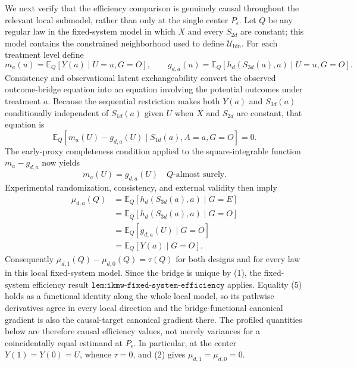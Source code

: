 We next verify that the efficiency comparison is genuinely causal throughout the relevant local submodel, rather than only at the single center \(P_\epsilon\).  Let \(Q\) be any regular law in the fixed-system model in which \(X\) and every \(S_{2d}\) are constant; this model contains the constrained neighborhood used to define \(\mathcal U_{\mathrm{bin}}\).  For each treatment level define
\[
 m_a(u)=\mathbb E_Q[Y(a)\mid U=u,G=O],
 \qquad
 g_{d,a}(u)=\mathbb E_Q[h_d(S_{3d}(a),a)\mid U=u,G=O].
\]
Consistency and observational latent exchangeability convert the observed outcome-bridge equation into an equation involving the potential outcomes under treatment \(a\).  Because the sequential restriction makes both \(Y(a)\) and \(S_{3d}(a)\) conditionally independent of \(S_{1d}(a)\) given \(U\) when \(X\) and \(S_{2d}\) are constant, that equation is
\[
 \mathbb E_Q\!\left[m_a(U)-g_{d,a}(U)
 \mid S_{1d}(a),A=a,G=O\right]=0. \tag{3}
\]
The early-proxy completeness condition applied to the square-integrable function \(m_a-g_{d,a}\) now yields
\[
 m_a(U)=g_{d,a}(U)\quad Q\text{-almost surely}. \tag{4}
\]
Experimental randomization, consistency, and external validity then imply
\[
 \begin{aligned}
 \mu_{d,a}(Q)
 &=\mathbb E_Q[h_d(S_{3d}(a),a)\mid G=E]\\
 &=\mathbb E_Q[h_d(S_{3d}(a),a)\mid G=O]\\
 &=\mathbb E_Q[g_{d,a}(U)\mid G=O]\\
 &=\mathbb E_Q[Y(a)\mid G=O].
 \end{aligned} \tag{5}
\]
Consequently \(\mu_{d,1}(Q)-\mu_{d,0}(Q)=\tau(Q)\) for both designs and for every law in this local fixed-system model.  Since the bridge is unique by (1), the fixed-system efficiency result \(\texttt{lem:ikmw-fixed-system-efficiency}\) applies.  Equality (5) holds as a functional identity along the whole local model, so its pathwise derivatives agree in every local direction and the bridge-functional canonical gradient is also the causal-target canonical gradient there.  The profiled quantities below are therefore causal efficiency values, not merely variances for a coincidentally equal estimand at \(P_\epsilon\).  In particular, at the center \(Y(1)=Y(0)=U\), whence \(\tau=0\), and (2) gives \(\mu_{d,1}=\mu_{d,0}=0\).

